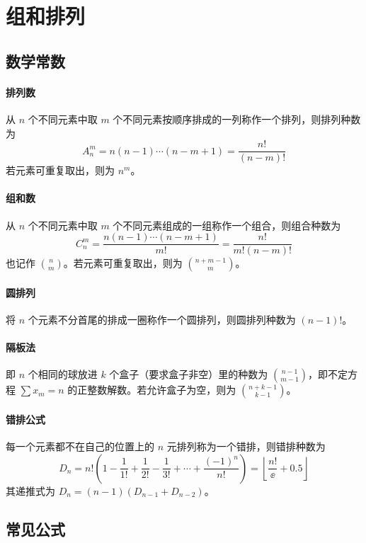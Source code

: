 \documentclass{pureart}
\begin{document}
\section{组和排列}

\subsection{数学常数}

\paragraph{排列数}
从 $n$ 个不同元素中取 $m$ 个不同元素按顺序排成的一列称作一个排列，则排列种数为 
\[ A_n^m = n(n-1)\cdots (n-m+1) = \frac{n!}{(n-m)!} \]
若元素可重复取出，则为 $n^m$。

\paragraph{组和数}
从 $n$ 个不同元素中取 $m$ 个不同元素组成的一组称作一个组合，则组合种数为
\[ C_n^m = \frac{n(n-1)\cdots(n-m+1)}{m!} = \frac{n!}{m!(n-m)!} \]
也记作 $\binom{n}{m}$。若元素可重复取出，则为 $\binom{n+m-1}{m}$。

\paragraph{圆排列}
将 $n$ 个元素不分首尾的排成一圈称作一个圆排列，则圆排列种数为 $(n-1)!$。

\paragraph{隔板法}
即 $n$ 个相同的球放进 $k$ 个盒子（要求盒子非空）里的种数为 $\binom{n-1}{m-1}$，即不定方程 $\sum x_m = n$ 的正整数解数。若允许盒子为空，则为 $\binom{n+k-1}{k-1}$。

\paragraph{错排公式}
每一个元素都不在自己的位置上的 $n$ 元排列称为一个错排，则错排种数为
\[ D_n = n! \left( 1 - \frac{1}{1!} + \frac{1}{2!} - \frac{1}{3!} + \cdots + \frac{(-1)^n}{n!} \right) = \left\lfloor \frac{n!}{\ee} + 0.5 \right\rfloor \]
其递推式为 $D_n = (n-1)(D_{n-1} + D_{n-2})$。

\subsection{常见公式}
\end{document}
